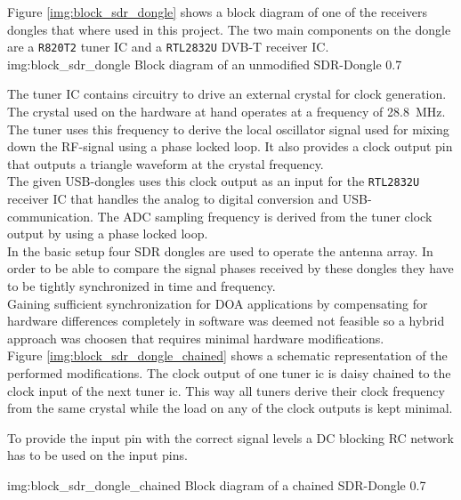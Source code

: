 Figure \ref{img:block_sdr_dongle} shows a block
diagram of one of the receivers dongles that where used
in this project.
The two main components on the dongle are a \texttt{R820T2} tuner IC
and a \texttt{RTL2832U} DVB-T receiver IC. \\

             {img:block_sdr_dongle}
             {Block diagram of an unmodified SDR-Dongle}
             {0.7}

The tuner IC contains circuitry to drive an
external crystal for clock generation.
The crystal used on the hardware at hand
operates at a frequency of \SI{28.8}{\mega\hertz}.
The tuner uses this frequency to derive the
local oscillator signal used for mixing down
the RF-signal using a phase locked loop.
It also provides a clock output pin that
outputs a triangle waveform at the crystal
frequency. \\

The given USB-dongles uses this clock output
as an input for the \texttt{RTL2832U}
receiver IC that handles the analog to digital
conversion and USB-communication.
The ADC sampling frequency is derived from
the tuner clock output by using a phase locked loop. \\

In the basic setup four SDR dongles are used
to operate the antenna array.
In order to be able to compare the signal phases
received by these dongles they have to be tightly
synchronized in time and frequency. \\

Gaining sufficient synchronization for DOA applications
by compensating for hardware differences completely
in software was deemed not feasible so a hybrid
approach was choosen that requires minimal hardware
modifications. \\

Figure \ref{img:block_sdr_dongle_chained} shows
a schematic representation of the performed modifications.
The clock output of one tuner ic is daisy chained to
the clock input of the next tuner ic.
This way all tuners derive their clock frequency
from the same crystal while the load on any of
the clock outputs is kept minimal.

To provide the input pin with the correct signal
levels a DC blocking RC network has to be used
on the input pins.

             {img:block_sdr_dongle_chained}
             {Block diagram of a chained SDR-Dongle}
             {0.7}


